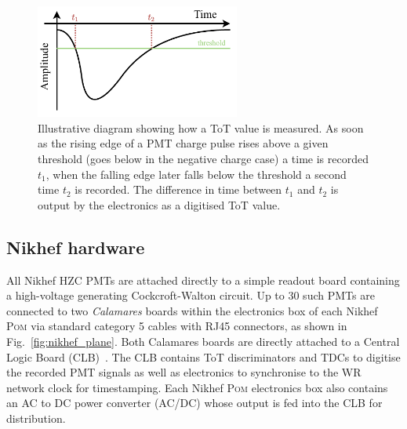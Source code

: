 \begin{figure} %
    \includegraphics[width=0.6\textwidth]{diagrams/5-daq/tot.pdf}
    \caption[Illustrative diagram showing how Time over Threshold is measured.]
    {Illustrative diagram showing how a ToT value is measured. As soon as the rising edge of a PMT
        charge pulse rises above a given threshold (goes below in the negative charge case) a time
        is recorded $t_{1}$, when the falling edge later falls below the threshold a second time
        $t_{2}$ is recorded. The difference in time between $t_{1}$ and $t_{2}$ is output by the
        electronics as a digitised ToT value.}
    \label{fig:tot}
\end{figure}

\subsection{Nikhef hardware} %
\label{sec:daq_hard_Nikhed} %

All Nikhef HZC PMTs are attached directly to a simple readout board containing a high-voltage
generating Cockcroft-Walton circuit. Up to 30 such PMTs are connected to two \emph{Calamares}
boards within the electronics box of each Nikhef \textsc{Pom} via standard category 5 cables with
RJ45 connectors, as shown in Fig.~\ref{fig:nikhef_plane}. Both Calamares boards are directly
attached to a Central Logic Board (CLB)~\cite{biagi2015, eijk2015}. The CLB contains ToT
discriminators and TDCs to digitise the recorded PMT signals as well as electronics to synchronise
to the WR network clock for timestamping. Each Nikhef \textsc{Pom} electronics box also contains
an AC to DC power converter (AC/DC) whose output is fed into the CLB for distribution.

